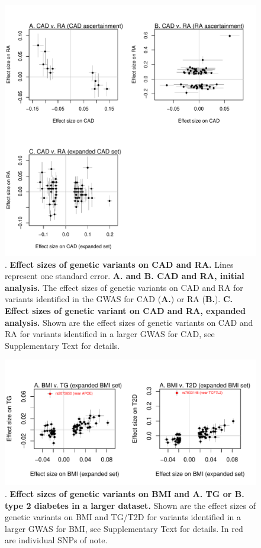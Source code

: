 \documentclass[11pt,titlepage]{article}
\begin{document}
\begin{figure}
\begin{center}
\includegraphics[scale = 0.6]{figs/cad_ra.pdf}
\caption{. \textbf{Effect sizes of genetic variants on CAD and RA.} Lines represent one standard error. \textbf{A. and B. CAD and RA, initial analysis.} The effect sizes of genetic variants on CAD and RA for variants identified in the GWAS for CAD (\textbf{A.}) or RA (\textbf{B.}). \textbf{C. Effect sizes of genetic variant on CAD and RA, expanded analysis.} Shown are the effect sizes of genetic variants on CAD and RA for variants identified in a larger GWAS for CAD, see Supplementary Text for details.} \label{f_cad_ra}
\end{center}
\end{figure}

\begin{figure}
\begin{center}
\includegraphics[scale = 0.6]{figs/bmi_expanded.pdf}
\caption{. \textbf{Effect sizes of genetic variants on BMI and A. TG or B. type 2 diabetes in a larger dataset.} Shown are the effect sizes of genetic variants on BMI and TG/T2D for variants identified in a larger GWAS for BMI, see Supplementary Text for details. In red are individual SNPs of note.}\label{f_bmi_expanded}
\end{center}
\end{figure}
\end{document}
